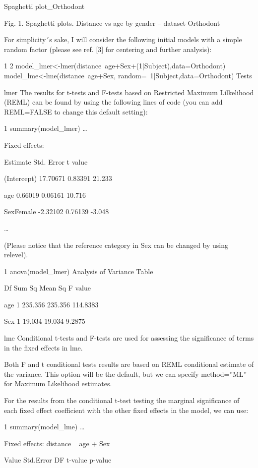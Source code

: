 \begin{itemize}
Spaghetti plot_Orthodont

Fig. 1. Spaghetti plots. Distance vs age by gender – dataset Orthodont

For simplicity´s sake, I will consider the following initial models with a simple random factor (please see ref. [3] for centering and further analysis):

1
2
model_lmer<-lmer(distance~age+Sex+(1|Subject),data=Orthodont)
model_lme<-lme(distance~age+Sex, random=~1|Subject,data=Orthodont)
Tests

lmer
The results for t-tests and F-tests based on Restricted Maximum Lilkelihood (REML) can be found by using the following lines of code (you can add REML=FALSE to change this default setting):

1
summary(model_lmer)
…

Fixed effects:

                           Estimate       Std. Error    t value

(Intercept)          17.70671       0.83391     21.233

age                      0.66019        0.06161     10.716

SexFemale           -2.32102        0.76139    -3.048

…

(Please notice that the reference category in Sex can be changed by using relevel).

1
anova(model_lmer)
Analysis of Variance Table

       Df      Sum Sq     Mean Sq      F value

age  1      235.356    235.356    114.8383

Sex  1        19.034      19.034        9.2875

lme
Conditional t-tests and F-tests are used for assessing the significance of terms in the fixed effects in lme.

Both F and t conditional tests results are based on REML conditional estimate of the variance. This option will be the default, but we can specify method=”ML”   for Maximum Likelihood estimates.

For the results from the conditional t-test testing the marginal significance of each fixed effect coefficient with the other fixed effects in the model, we can use:

1
summary(model_lme)
…

Fixed effects: distance ~ age + Sex

                                Value      Std.Error    DF         t-value       p-value


\end{itemize}
